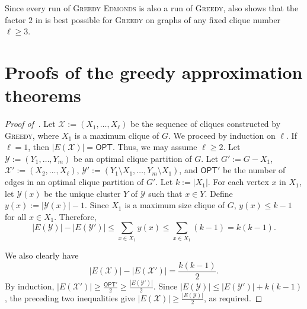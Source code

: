 \documentclass[a4paper,fleqn]{cas-sc}
\theoremstyle{remark}
\theoremstyle{plain}
\newcommand{\cd}{\textsc{Cluster Deletion}}
\newcommand{\greedy}{{\textsc{Greedy}}}
\newcommand{\edmonds}{{\textsc{Greedy Edmonds}}}
\newcommand{\opt}{{\mathsf{OPT}}}
\begin{document}
Since every run of \edmonds{} is also a run of \greedy{},  also shows that the factor $2$ in  is best possible for \greedy{} on graphs of any fixed clique number $\ell\geq 3$.  

\appendix
\section{Proofs of the greedy approximation theorems} \label{app:greedy}
\begin{proof}[Proof of~]
    Let $\mathcal{X}:=(X_1, \dots, X_\ell)$ be the sequence of cliques constructed by \greedy{}, where $X_1$ is a maximum clique of $G$.  We proceed by induction on $\ell$.  If $\ell=1$, then $|E(\mathcal{X})| = \opt$.  Thus, we may assume $\ell \geq 2$.  Let $\mathcal{Y}:=(Y_1, \dots, Y_m)$ be an optimal clique partition of $G$.  
    Let $G':=G-X_1$, $\mathcal{X}':=(X_2, \dots, X_\ell)$, $\mathcal{Y}':=(Y_1 \setminus X_1, \dots, Y_m \setminus X_1)$, and $\opt'$ be the number of edges in an optimal clique partition of $G'$.  Let $k:=|X_1|$.  For each vertex $x$ in $X_1$, let $\mathcal{Y}(x)$ be the unique cluster $Y$ of $\mathcal{Y}$ such that $x \in Y$.  Define $y(x):=|\mathcal{Y}(x)|-1$.  
    Since $X_1$ is a maximum size clique of $G$, $y(x) \leq k-1$ for all $x \in X_1$.   
    Therefore, 
 \[
    |E(\mathcal{Y})|-|E(\mathcal{Y}')|
    \leq \sum_{x \in X_1} y(x)
    \leq \sum_{x \in X_1}(k-1)=k(k-1).
    \]
  
    We also clearly have
      \[
    |E(\mathcal{X})|-|E(\mathcal{X}')| =\frac{k(k-1)}{2}.
    \]
    By induction, $|E(\mathcal{X}')| \geq \frac{\opt'}{2} \geq \frac{|E(\mathcal{Y}')|}{2}$. Since
    $|E(\mathcal{Y})|\leq |E(\mathcal{Y}')|+k(k-1)$, the preceding
    two inequalities give
    $|E(\mathcal{X})| \geq \frac{|E(\mathcal{Y})|}{2}$, as required.
\end{proof}
\end{document}
